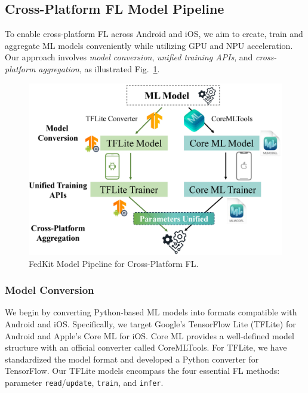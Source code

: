 \documentclass[letterpaper]{article} %
\begin{document}
\subsection{Cross-Platform FL Model Pipeline}

To enable cross-platform FL across Android and iOS,
we aim to create, train and aggregate ML models conveniently while
utilizing GPU and NPU acceleration.
Our approach involves \textit{model conversion},
\textit{unified training APIs},
and \textit{cross-platform aggregation}, as illustrated Fig.~\ref{cross_fl}.

\begin{figure}
    \centering
    \includegraphics*[width=\linewidth]{cross_smart_fl_workflow.pdf}
    \caption{FedKit Model Pipeline for Cross-Platform FL.}
    \label{cross_fl}
\end{figure}

\subsubsection{Model Conversion}
We begin by converting Python-based ML models into formats compatible with
Android and iOS.
Specifically, we target Google's TensorFlow Lite (TFLite) for Android and
Apple's Core ML for iOS.
Core ML provides a well-defined model structure with
an official converter called CoreMLTools.
For TFLite, we have standardized the model format and
developed a Python converter for TensorFlow.
Our TFLite models encompass the four essential FL methods:
parameter \texttt{read}/\texttt{update}, \texttt{train}, and \texttt{infer}.
\end{document}
